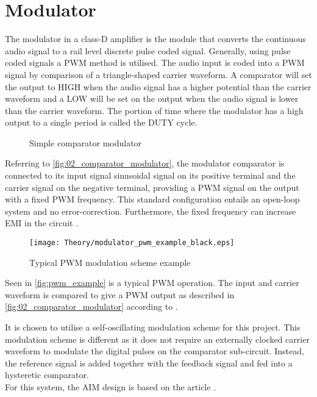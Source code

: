 \section{Modulator}
The modulator in a class-D amplifier is the module that converts the continuous audio signal to a rail level discrete pulse coded signal. Generally, using pulse coded signals a PWM method is utilised. The audio input is coded into a PWM signal by comparison of a triangle-shaped carrier waveform. A comparator will set the output to HIGH when the audio signal has a higher potential than the carrier waveform and a LOW will be set on the output when the audio signal is lower than the carrier waveform. The portion of time where the modulator has a high output to a single period is called the DUTY cycle.
\begin{figure}[htbp]
	\centering
	\begin{circuitikz}
		
	\end{circuitikz}
	\caption{Simple comparator modulator}
	\label{fig:02_comparator_modulator}
\end{figure}
Referring to \autoref{fig:02_comparator_modulator}, the modulator comparator is connected to its input signal sinusoidal signal on its positive terminal and the carrier signal on the negative terminal, providing a PWM signal on the output with a fixed PWM frequency. This standard configuration entails an open-loop system and no error-correction. Furthermore, the fixed frequency can increase EMI in the circuit \cite{sw_freq_variations_and_EMI_prop_in_selfosc_classD_amps}. \\

\begin{figure}[htbp]
	\centering
	\texttt{[image: Theory/modulator\_pwm\_example\_black.eps]}
	\caption{Typical PWM modulation scheme example}
	\label{fig:pwm_example}
\end{figure}
Seen in \autoref{fig:pwm_example} is a typical PWM operation. The input and carrier waveform is compared to give a PWM output as described in \autoref{fig:02_comparator_modulator} according to .

It is chosen to utilise a self-oscillating modulation scheme for this project. This modulation scheme is different as it does not require an externally clocked carrier waveform to modulate the digital pulses on the comparator sub-circuit. Instead, the reference signal is added together with the feedback signal and fed into a hysteretic comparator. \\
For this system, the AIM design is based on the article \cite{Comp_Simp_selfosc_PWM_mod}. 


